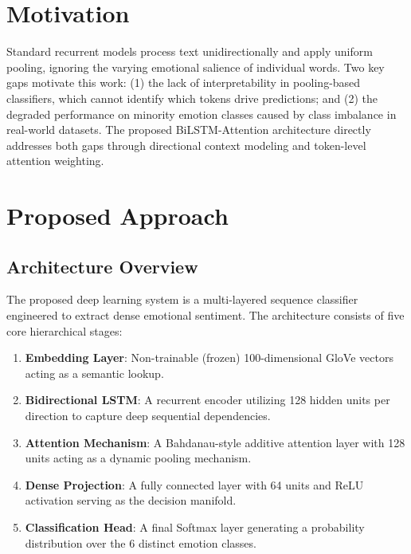 \documentclass[conference]{IEEEtran}
\begin{document}
\section{Motivation}

Standard recurrent models process text unidirectionally and apply uniform pooling, ignoring the varying emotional salience of individual words. Two key gaps motivate this work: (1) the lack of interpretability in pooling-based classifiers, which cannot identify which tokens drive predictions; and (2) the degraded performance on minority emotion classes caused by class imbalance in real-world datasets. The proposed BiLSTM-Attention architecture directly addresses both gaps through directional context modeling and token-level attention weighting.

\section{Proposed Approach}

\subsection{Architecture Overview}
The proposed deep learning system is a multi-layered sequence classifier engineered to extract dense emotional sentiment. The architecture consists of five core hierarchical stages:
\begin{enumerate}
  \item \textbf{Embedding Layer}: Non-trainable (frozen) 100-dimensional GloVe vectors acting as a semantic lookup.
  \item \textbf{Bidirectional LSTM}: A recurrent encoder utilizing 128 hidden units per direction to capture deep sequential dependencies.
  \item \textbf{Attention Mechanism}: A Bahdanau-style additive attention layer with 128 units acting as a dynamic pooling mechanism.
  \item \textbf{Dense Projection}: A fully connected layer with 64 units and ReLU activation serving as the decision manifold.
  \item \textbf{Classification Head}: A final Softmax layer generating a probability distribution over the 6 distinct emotion classes.
\end{enumerate}
\end{document}
